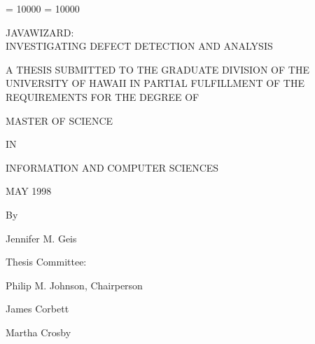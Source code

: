 
\clubpenalty = 10000    
\widowpenalty = 10000
\sloppy
\thispagestyle{empty}

\par\vspace*{0.00in}

\begin{center}
  JAVAWIZARD:\\ 

  INVESTIGATING DEFECT DETECTION AND ANALYSIS
\end{center}

\vspace*{0.6in}

  \begin{center}  
  A THESIS SUBMITTED TO THE GRADUATE DIVISION OF THE\\
  
  UNIVERSITY OF HAWAII IN PARTIAL FULFILLMENT OF THE\\
  
  REQUIREMENTS FOR THE DEGREE OF 
\end{center}

\begin{center}

  MASTER OF SCIENCE

 IN

 INFORMATION AND COMPUTER SCIENCES

 MAY 1998


\vspace*{0.7in}
 
  By   
  
  \vspace{.2in}
  
  Jennifer M. Geis

  \vspace{0.2in}
\end{center}  

\begin{center}
  Thesis Committee:
  \vspace{0.2in}

  Philip M. Johnson, Chairperson

  James Corbett

  Martha Crosby

\end{center}  



